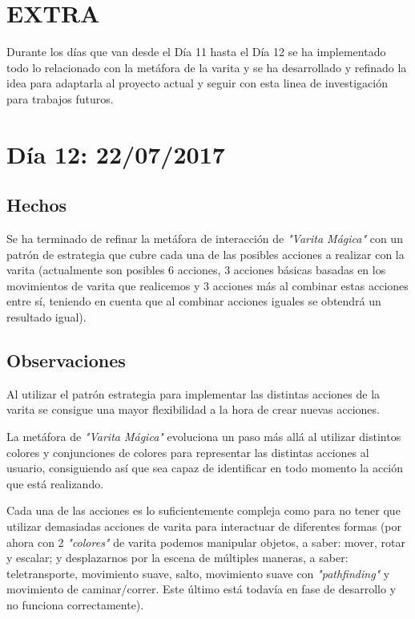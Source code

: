 \documentclass[12pt,a4paper]{article}
\begin{document}
\section{EXTRA}

Durante los días que van desde el Día 11 hasta el Día 12 se ha implementado todo lo relacionado con la metáfora de la varita y se ha desarrollado y refinado la idea para adaptarla al proyecto actual y seguir con esta linea de investigación para trabajos futuros.

\section{Día 12: 22/07/2017}

\subsection{Hechos}

Se ha terminado de refinar la metáfora de interacción de \textit{"Varita Mágica"} con un patrón de estrategia que cubre cada una de las posibles acciones a realizar con la varita (actualmente son posibles 6 acciones, 3 acciones básicas basadas en los movimientos de varita que realicemos y 3 acciones más al combinar estas acciones entre sí, teniendo en cuenta que al combinar acciones iguales se obtendrá un resultado igual).

\subsection{Observaciones}

Al utilizar el patrón estrategia para implementar las distintas acciones de la varita se consigue una mayor flexibilidad a la hora de crear nuevas acciones.

La metáfora de \textit{"Varita Mágica"} evoluciona un paso más allá al utilizar distintos colores y conjunciones de colores para representar las distintas acciones al usuario, consiguiendo así que sea capaz de identificar en todo momento la acción que está realizando.

Cada una de las acciones es lo suficientemente compleja como para no tener que utilizar demasiadas acciones de varita para interactuar de diferentes formas (por ahora con 2 \textit{"colores"} de varita podemos manipular objetos, a saber: mover, rotar y escalar; y desplazarnos por la escena de múltiples maneras, a saber: teletransporte, movimiento suave, salto, movimiento suave con \textit{"pathfinding"} y movimiento de caminar/correr. Este último está todavía en fase de desarrollo y no funciona correctamente).
\end{document}
